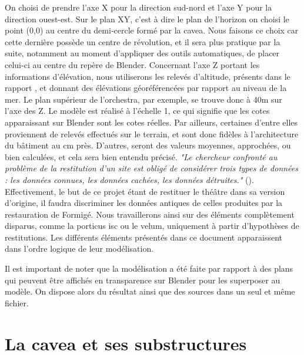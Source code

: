 On choisi de prendre l'axe X pour la direction sud-nord et l'axe Y pour la direction ouest-est. Sur le plan XY, c'est à dire le plan de l'horizon on choisi le point (0,0) au centre du demi-cercle formé par la \gls{cavea}. Nous faisons ce choix car cette dernière possède un centre de révolution, et il sera plus pratique par la suite, notamment au moment d'appliquer des outils automatiques, de placer celui-ci au centre du repère de Blender. Concernant l'axe Z portant les informations d'élévation, nous utiliserons les relevés d'altitude, présents dans le rapport \cite{orangePl}, et donnant des élévations géoréférencées par rapport au niveau de la mer. Le plan supérieur de l'\gls{orchestra}, par exemple, se trouve donc à 40m sur l'axe des Z. Le modèle est réalisé à l'échelle 1, ce qui signifie que les cotes apparaissant sur Blender sont les cotes réelles. Par ailleurs, certaines d'entre elles proviennent de relevés effectués sur le terrain, et sont donc fidèles à l'architecture du bâtiment au cm près. D'autres, seront des valeurs moyennes, approchées, ou bien calculées, et cela sera bien entendu précisé. \textit{"Le chercheur confronté au problème de la restitution d’un site est obligé de considérer trois types de données : les données connues, les données cachées, les données détruites."} (\cite{golvin}). Effectivement, le but de ce projet étant de restituer le théâtre dans sa version d'origine, il faudra discriminer les données antiques de celles produites par la restauration de Formigé. Nous travaillerons ainsi sur des éléments complètement disparus, comme la \gls{porticus isc} ou le \gls{velum}, uniquement à partir d'hypothèses de restitutions. Les différents éléments présentés dans ce document apparaissent dans l'ordre logique de leur modélisation.

Il est important de noter que la modélisation a été faite par rapport à des plans qui peuvent être affichés en transparence sur Blender pour les superposer au modèle. On dispose alors du résultat ainsi que des sources dans un seul et même fichier.

\section{La  \gls{cavea} et ses substructures}  
	\label{La cavea et ses substructures}

